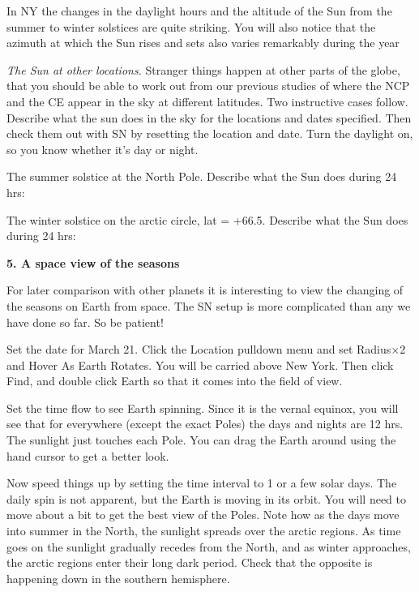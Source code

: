 In NY the changes in the daylight hours and the altitude of the Sun 
from the summer to winter solstices are quite striking. You will also
notice that the azimuth at which the Sun rises and sets also varies
remarkably during the year



\bigskip
\noindent
\emph{The Sun at other locations.} Stranger things happen at other
parts of the globe, that you should be able to work out from our
previous studies of where the NCP and the CE appear in the sky at
different latitudes.  Two instructive cases follow.  Describe what the
sun does in the sky for the locations and dates specified.  Then check
them out with SN by resetting the location and date. Turn the daylight
on, so you know whether it's day or night.

\medskip
\noindent The summer solstice at the North Pole. Describe what the Sun
does during 24 hrs:

\medskip
 \hrulefill

\medskip
\noindent The winter solstice on the arctic circle, lat =
+66.5\deg.  Describe what the Sun does during 24 hrs:

\medskip
\hrulefill



\bigskip
\bigskip
\noindent
{\bf 5. A space view of the seasons}

\medskip
\noindent
For later comparison with other planets it is interesting to view the
changing of the seasons on Earth from space. The SN setup is more
complicated than any we have done so far. So be patient!

Set the date for March 21. Click the Location pulldown menu and set
Radius$\times$2 and Hover As Earth Rotates.  You will be carried above
New York. Then click Find, and
double click Earth so that it comes into the field of view. 

Set the time flow to see Earth spinning. Since it
is the vernal equinox, you will see that for everywhere (except the exact
Poles) the days and nights are 12 hrs. The sunlight just touches each
Pole. You can drag the Earth around using the hand cursor to get a
better look.

Now speed things up by setting the time interval to 1 or a few solar days. The
daily spin is not apparent, but the Earth is moving in its orbit. You will need to move about a bit to get the best
view of the Poles.  Note how as the days move into summer in the
North, the sunlight spreads over the arctic regions.
As time goes on the sunlight gradually recedes from the North, and as
winter approaches, the arctic regions enter their long dark
period. Check that the opposite is happening down in the southern
hemisphere.

